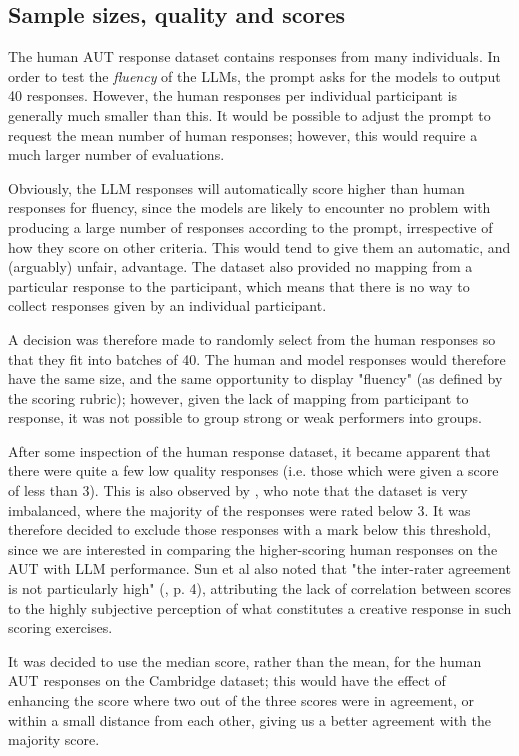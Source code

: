 \documentclass{article}
\begin{document}
 

\subsection{Sample sizes, quality and scores}

The human AUT response dataset contains responses from many individuals. In order to test the \emph{fluency} of the LLMs, the prompt asks for the models to output 40 responses. However, the human responses per individual participant is generally much smaller than this. It would be possible to adjust the prompt to request the mean number of human responses; however, this would require a much larger number of evaluations.   

Obviously, the LLM responses will automatically score higher than human responses for fluency, since the models are likely to encounter no problem with producing a large number of responses according to the prompt, irrespective of how they score on other criteria. This would tend to give them an automatic, and (arguably) unfair, advantage. The dataset also provided no mapping from a particular response to the participant, which means that there is no way to collect responses given by an individual participant.   

A decision was therefore made to randomly select from the human responses so that they fit into batches of 40. The human and model responses would therefore have the same size, and the same opportunity to display "fluency" (as defined by the scoring rubric); however, given the lack of mapping from participant to response, it was not possible to group strong or weak performers into groups.
 
After some inspection of the human response dataset, it became apparent that there were quite a few low quality responses (i.e. those which were given a score of less than 3). This is also observed by \cite{Sun_2024}, who note that the dataset is very imbalanced, where the majority of the responses were rated below 3. It was therefore decided to exclude those responses with a mark below this threshold, since we are interested in comparing the higher-scoring human responses on the AUT with LLM performance. Sun et al also noted that "the inter-rater agreement is not particularly high" (\cite{Sun_2024}, p. 4), attributing the lack of correlation between scores to the highly subjective perception of what constitutes a creative response in such scoring exercises. 

It was decided to use the median score, rather than the mean, for the human AUT responses on the Cambridge dataset; this would have the effect of enhancing the score where two out of the three scores were in agreement, or within a small distance from each other, giving us a better agreement with the majority score.
\end{document}
